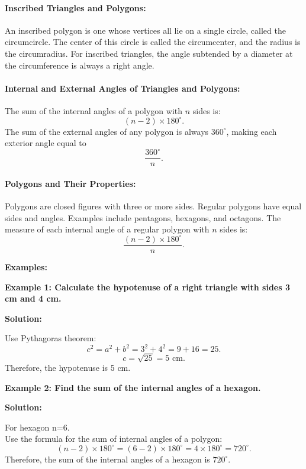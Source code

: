 \paragraph{Inscribed Triangles and Polygons:} An inscribed polygon is one whose vertices all lie on a single circle, called the circumcircle. The center of this circle is called the circumcenter, and the radius is the circumradius. For inscribed triangles, the angle subtended by a diameter at the circumference is always a right angle.

\paragraph{Internal and External Angles of Triangles and Polygons:} The sum of the internal angles of a polygon with $n$ sides is:
\[
(n-2) \times 180^\circ.
\]
The sum of the external angles of any polygon is always $360^\circ$, making each exterior angle equal to 
\[
\frac{360^\circ}{n}.
\]

\paragraph{Polygons and Their Properties:} Polygons are closed figures with three or more sides. Regular polygons have equal sides and angles. Examples include pentagons, hexagons, and octagons. The measure of each internal angle of a regular polygon with $n$ sides is:
\[
\frac{(n-2) \times 180^\circ}{n}.
\]

\textbf{Examples:}

\begin{flushleft}
	\textbf{Example 1: Calculate the hypotenuse of a right triangle with sides 3 cm and 4 cm.}
	
	\vspace{0.5cm}
	\textbf{Solution:}
	\vspace{0.5cm}
	
	Use Pythagoras theorem:
	\[
	c^2 = a^2 + b^2 = 3^2 + 4^2 = 9 + 16 = 25.
	\]
	\[
	c = \sqrt{25} = 5 \text{ cm}.
	\]
	Therefore, the hypotenuse is 5 cm.
\end{flushleft}

\begin{flushleft}
	\textbf{Example 2: Find the sum of the internal angles of a hexagon.}
	
	\vspace{0.5cm}
	\textbf{Solution:}
	\vspace{0.5cm}
	
	For hexagon n=6.\\
	Use the formula for the sum of internal angles of a polygon:
	\[
	(n-2) \times 180^\circ = (6-2) \times 180^\circ = 4 \times 180^\circ = 720^\circ.
	\]
	Therefore, the sum of the internal angles of a hexagon is $720^\circ$.
\end{flushleft}

